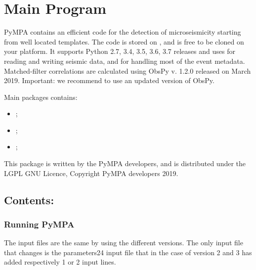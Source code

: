 \documentclass[a4paper,10pt,english]{sphinxmanual}
\begin{document}
\section{Main Program}
\label{\detokenize{main:main-program}}\label{\detokenize{main::doc}}
PyMPA contains an efficient code for the detection of microseismicity starting from well located templates.
The code is stored on , and is free to be cloned on your platform. It supports Python 2.7, 3.4, 3.5, 3.6, 3.7
releases and uses  for reading and writing seismic data, and for handling most
of the event metadata. Matched-filter correlations are calculated using ObsPy v. 1.2.0  released on March
2019.
Important: we recommend to use an updated version of ObsPy.

Main packages contains:
\begin{itemize}
\item {} 
{\hyperref[\detokenize{sub/main.pympa::doc}]{}};

\item {} 
{\hyperref[\detokenize{sub/main.pympa_channel_limit::doc}]{}};

\item {} 
{\hyperref[\detokenize{sub/main.pympa_chunks_channel_limit::doc}]{}};

\end{itemize}

This package is written by the PyMPA developers, and is distributed under the LGPL GNU Licence, Copyright PyMPA developers 2019.


\subsection{Contents:}
\label{\detokenize{main:contents}}

\subsubsection{Running PyMPA}
\label{\detokenize{sub/main.pympa:running-pympa}}\label{\detokenize{sub/main.pympa::doc}}
The input files are the same by using the different versions. The only input file that changes is the parameters24 input file that in the case of version 2 and 3 has added respectively 1 or 2 input lines.
\end{document}
